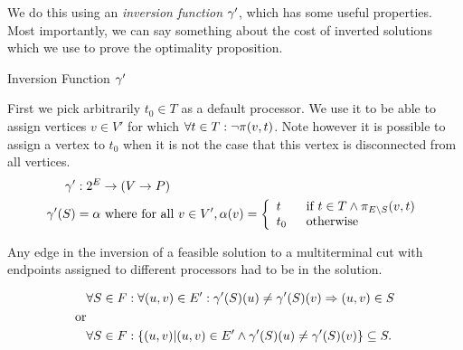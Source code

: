 We do this using an {\em inversion function} $\gamma'$, which has some useful properties.
Most importantly, we can say something about the cost of inverted solutions which we use to prove the optimality proposition.

\begin{definition}
Inversion Function $\gamma'$

First we pick arbitrarily $t_0 \in T$ as a default processor.
We use it to be able to assign vertices $v \in V'$ for which $\forall t \in T : \neg\pi_{}(v, t)$.
Note however it is possible to assign a vertex to $t_0$ when it is not the case that this vertex is disconnected from all vertices.
\begin{align}
	\nonumber \gamma' & : 2^E \rightarrow (V \rightarrow P) \\
	\nonumber \gamma'(S) & = \alpha \mbox{ where for all } v \in V', \alpha(v) = \mbox{$\left\{ 
		\begin{array}{l l}
			t \quad & \mbox{if $t \in T \wedge \pi_{E \setminus S}(v, t)$}\\
			t_0 & \mbox{otherwise}\\ \end{array} \right.$} 
\end{align}

\end{definition}

\begin{lemma}
\label{INVERSESUBSET}
Any edge in the inversion of a feasible solution to a multiterminal cut with endpoints assigned to different processors had to be in the solution.

\begin{align}
	\nonumber & \forall S \in F : \forall (u, v) \in E' : \gamma'(S)(u) \neq \gamma'(S)(v) \Rightarrow (u,v) \in S \\
	\nonumber \mbox{or} &\\
	\nonumber & \forall S \in F : \{(u,v) |(u, v) \in E' \wedge \gamma'(S)(u) \neq \gamma'(S)(v)\} \subseteq S.
\end{align}
\end{lemma}

